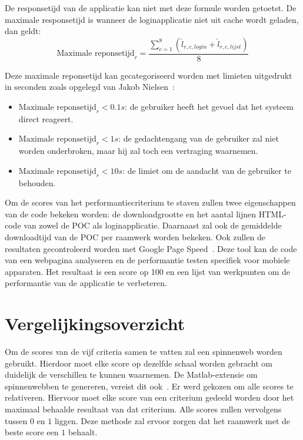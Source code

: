 De responsetijd van de applicatie kan niet met deze formule worden getoetst.
De maximale responsetijd is wanneer de loginapplicatie niet uit cache wordt geladen, dan geldt:
\begin{equation}
  \text{Maximale reponsetijd}_r= \frac{\sum_{c=1}^{8}\left(\widehat{l}_{r,c,login} + \widehat{l}_{r,c,lijst}\right)}{8}
  \label{eq:performantie-max}
\end{equation}

Deze maximale reponsetijd kan gecategoriseerd worden met limieten uitgedrukt in seconden zoals opgelegd van Jakob Nielsen~\cite{Nielsen1993}:  
\begin{itemize}
\item $\text{Maximale reponsetijd}_r < 0.1\unit{s}$: de gebruiker heeft het gevoel dat het systeem direct reageert.
\item $\text{Maximale reponsetijd}_r < 1\unit{s}$: de gedachtengang van de gebruiker zal niet worden onderbroken, maar hij zal toch een vertraging waarnemen.
\item $\text{Maximale reponsetijd}_r < 10\unit{s}$: de limiet om de aandacht van de gebruiker te behouden.
\end{itemize}

Om de scores van het performantiecriterium te staven zullen twee eigenschappen van de code bekeken worden:  de downloadgrootte en het aantal lijnen HTML-code van zowel de POC als loginapplicatie.
Daarnaast zal ook de gemiddelde downloadtijd van de POC per raamwerk worden bekeken.
Ook zullen de resultaten gecontroleerd worden met Google Page Speed~\cite{Morgan2011}. 
Deze tool kan de code van een webpagina analyseren en de performantie testen specifiek voor mobiele apparaten.
Het resultaat is een score op 100 en een lijst van werkpunten om de performantie van de applicatie te verbeteren.


\section{Vergelijkingsoverzicht}
\label{sec:vergelijking-spinnenweb}

Om de scores van de vijf criteria samen te vatten zal een spinnenweb worden gebruikt.
Hierdoor moet elke score op dezelfde schaal worden gebracht om duidelijk de verschillen te kunnen waarnemen.
De Matlab-extensie om spinnenwebben te genereren, vereist dit ook~\cite{Martti2007}.
Er werd gekozen om alle scores te relativeren.
Hiervoor moet elke score van een criterium gedeeld worden door het maximaal behaalde resultaat van dat criterium.
Alle scores zullen vervolgens tussen $0$ en $1$ liggen.
Deze methode zal ervoor zorgen dat het raamwerk met de beste score een $1$ behaalt.

